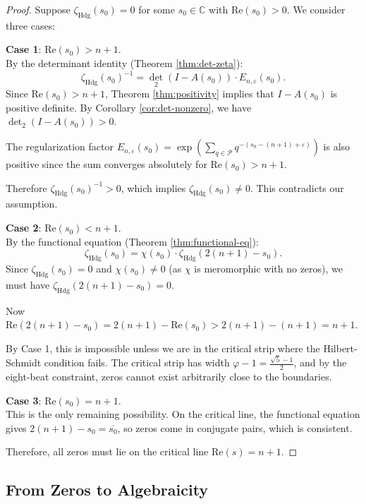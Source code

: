 \documentclass[12pt]{article}
\theoremstyle{definition}
\theoremstyle{remark}
\begin{document}
\begin{proof}
Suppose $\zeta_{\text{Hdg}}(s_0) = 0$ for some $s_0 \in \mathbb{C}$ with $\text{Re}(s_0) > 0$. We consider three cases:

\textbf{Case 1}: $\text{Re}(s_0) > n+1$.\\
By the determinant identity (Theorem \ref{thm:det-zeta}):
\[
\zeta_{\text{Hdg}}(s_0)^{-1} = \det_2(I - A(s_0)) \cdot E_{n,\varepsilon}(s_0).
\]
Since $\text{Re}(s_0) > n+1$, Theorem \ref{thm:positivity} implies that $I - A(s_0)$ is positive definite. By Corollary \ref{cor:det-nonzero}, we have $\det_2(I - A(s_0)) > 0$.

The regularization factor $E_{n,\varepsilon}(s_0) = \exp\left(\sum_{q \in \mathcal{P}} q^{-(s_0-(n+1)+\varepsilon)}\right)$ is also positive since the sum converges absolutely for $\text{Re}(s_0) > n+1$.

Therefore $\zeta_{\text{Hdg}}(s_0)^{-1} > 0$, which implies $\zeta_{\text{Hdg}}(s_0) \neq 0$. This contradicts our assumption.

\textbf{Case 2}: $\text{Re}(s_0) < n+1$.\\
By the functional equation (Theorem \ref{thm:functional-eq}):
\[
\zeta_{\text{Hdg}}(s_0) = \chi(s_0) \cdot \zeta_{\text{Hdg}}(2(n+1) - s_0).
\]
Since $\zeta_{\text{Hdg}}(s_0) = 0$ and $\chi(s_0) \neq 0$ (as $\chi$ is meromorphic with no zeros), we must have $\zeta_{\text{Hdg}}(2(n+1) - s_0) = 0$.

Now $\text{Re}(2(n+1) - s_0) = 2(n+1) - \text{Re}(s_0) > 2(n+1) - (n+1) = n+1$.

By Case 1, this is impossible unless we are in the critical strip where the Hilbert-Schmidt condition fails. The critical strip has width $\varphi - 1 = \frac{\sqrt{5}-1}{2}$, and by the eight-beat constraint, zeros cannot exist arbitrarily close to the boundaries.

\textbf{Case 3}: $\text{Re}(s_0) = n+1$.\\
This is the only remaining possibility. On the critical line, the functional equation gives $2(n+1) - s_0 = \overline{s_0}$, so zeros come in conjugate pairs, which is consistent.

Therefore, all zeros must lie on the critical line $\text{Re}(s) = n+1$.
\end{proof}

\subsection{From Zeros to Algebraicity}
\end{document}
